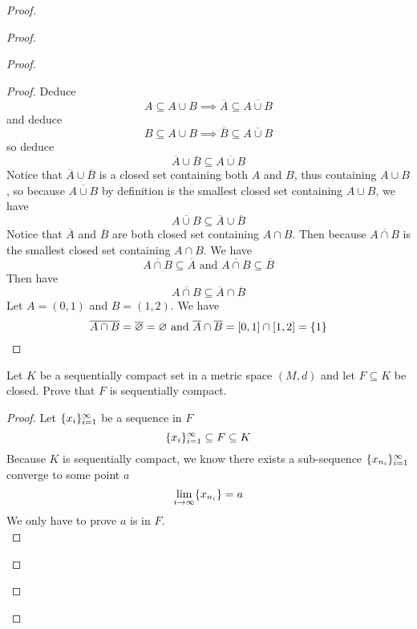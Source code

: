\documentclass{report}
\begin{document}
\begin{proof}
\begin{proof}
\begin{proof}
\begin{proof}
Deduce
\begin{equation}
A\subseteq A\cup B\implies \overline{A}\subseteq \overline{A\cup B}
\end{equation}
and deduce
\begin{equation}
B\subseteq A\cup B\implies \overline{B}\subseteq \overline{A\cup B}
\end{equation}
so deduce
\begin{equation}
\overline{A}\cup \overline{B}\subseteq \overline{A\cup B}
\end{equation}
Notice that $\overline{A}\cup \overline{B}$ is a closed set containing both $A$ and  $B$, thus containing $A\cup B$, so because $\overline{A\cup B}$ by definition is the smallest closed set containing $A\cup B$, we have
\begin{equation}
\overline{A\cup B}\subseteq \overline{A}\cup \overline{B}
\end{equation}
Notice that $\overline{A}$ and $\overline{B}$ are both closed set containing $A\cap B$. Then because $\overline{A\cap B}$ is the smallest closed set containing  $A\cap B$. We have
\begin{equation}
\overline{A\cap B}\subseteq \overline{A}\text{ and }\overline{A\cap B}\subseteq \overline{B}
\end{equation}
Then have
\begin{equation}
\overline{A\cap B}\subseteq \overline{A}\cap \overline{B}
\end{equation}
Let $A=(0,1)$ and $B=(1,2)$. We have
\begin{equation}
\overline{A\cap B}=\overline{\varnothing}=\varnothing\text{ and }\overline{A}\cap \overline{B}=[0,1]\cap [1,2]=\{ 1 \}
\end{equation}
\end{proof}
\begin{question}{}{}

Let \( K \) be a sequentially compact set in a metric space \( (M, d) \) and let \( F \subseteq K \) be closed. Prove that \( F \) is sequentially compact.
\end{question}
\begin{proof}
Let $\{ x_i \}_{i=1}^\infty$ be a sequence in $F$
\begin{equation}
  \{ x_i \}_{i=1}^\infty \subseteq F\subseteq K
\end{equation}
Because $K$ is sequentially compact, we know there exists a sub-sequence $\{ x_{n_i} \}_{i=1}^\infty$ converge to some point $a$
 \begin{equation}
\lim_{i\to\infty}\{ x_{n_i} \}=a
\end{equation}
We only have to prove  $a$ is in  $F$.\\


\end{proof}
\end{proof}
\end{proof}
\end{proof}
\end{document}
